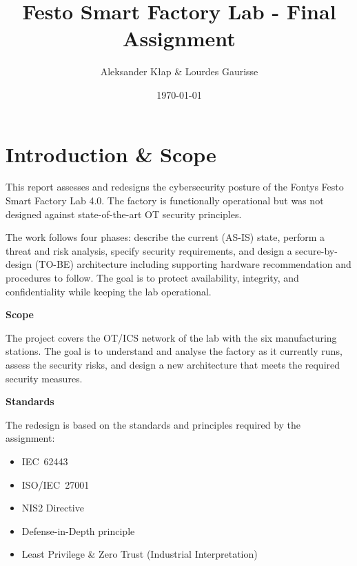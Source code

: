 \documentclass{report}
\title{Festo Smart Factory Lab - Final Assignment}
\author{Aleksander Kłap \& Lourdes Gaurisse}
\date{\today}
\begin{document}
\maketitle

\tableofcontents
\listoftables
\listoffigures
\setcounter{page}{3}

\setcounter{page}{1}

\chapter{Introduction \& Scope}\label{chap:1-intro}
This report assesses and redesigns the cybersecurity posture of the Fontys Festo Smart Factory Lab 4.0. The factory is functionally operational but was not designed against state-of-the-art OT security principles.

The work follows four phases: describe the current (AS-IS) state, perform a threat and risk analysis, specify security requirements, and design a secure-by-design (TO-BE) architecture including supporting hardware recommendation and procedures to follow. The goal is to protect availability, integrity, and confidentiality while keeping the lab operational.

\textbf{Scope}

The project covers the OT/ICS network of the lab with the six manufacturing stations. The goal is to understand and analyse the factory as it currently runs, assess the security risks, and design a new architecture that meets the required security measures.

\textbf{Standards}

The redesign is based on the standards and principles required by the assignment: 
\begin{itemize}
    \item IEC~62443
    \item ISO/IEC~27001
    \item NIS2 Directive
    \item Defense-in-Depth principle
    \item Least Privilege \& Zero Trust (Industrial Interpretation)
\end{itemize}

\end{document}
